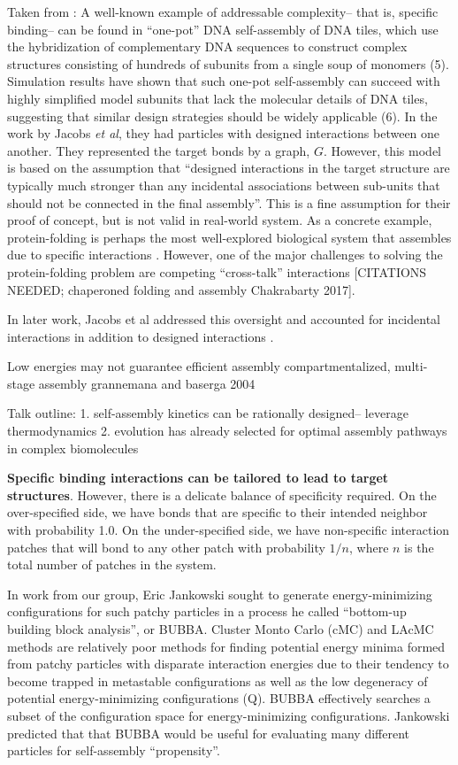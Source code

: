 Taken from \cite{Jacobs_2015_JChemPhys}: 
A well-known example of addressable complexity-- that is, specific binding-- can be found in ``one-pot'' DNA self-assembly of DNA tiles, which use the hybridization of complementary DNA sequences to construct complex structures consisting of hundreds of subunits from a single soup of monomers \cite{Ke_2012_Science} (5).
Simulation results have shown that such one-pot self-assembly can succeed with highly simplified model subunits that lack the molecular details of DNA tiles, suggesting that similar design strategies should be widely applicable \cite{Reinhardt_2014_PRL} (6).
In the work by Jacobs \textit{et al}, they had particles with designed interactions between one another.
They represented the target bonds by a graph, $G$.
However, this model is based on the assumption that ``designed interactions in the target structure are typically much stronger than any incidental associations between sub-units that should not be connected in the final assembly''.
This is a fine assumption for their proof of concept, but is not valid in real-world system.
As a concrete example, protein-folding is perhaps the most well-explored biological system that assembles due to specific interactions \cite{Dill_1993_CurrOpinStructBiol}.
However, one of the major challenges to solving the protein-folding problem are competing ``cross-talk'' interactions [CITATIONS NEEDED; chaperoned folding and assembly Chakrabarty 2017].

In later work, Jacobs et al addressed this oversight and accounted for incidental interactions in addition to designed interactions \cite{Jacobs_2015_PNAS}.


Low energies may not guarantee efficient assembly
compartmentalized, multi-stage assembly
grannemana and baserga 2004

Talk outline:
1. self-assembly kinetics can be rationally designed-- leverage thermodynamics
2. evolution has already selected for optimal assembly pathways in complex biomolecules


\textbf{Specific binding interactions can be tailored to lead to target structures}.
However, there is a delicate balance of specificity required.
On the over-specified side, we have bonds that are specific to their intended neighbor with probability 1.0.
On the under-specified side, we have non-specific interaction patches that will bond to any other patch with probability $1/n$, where $n$ is the total number of patches in the system.

In work from our group, Eric Jankowski sought to generate energy-minimizing configurations for such patchy particles \cite{Jankowski_2009_JChemPhys} in a process he called ``bottom-up building block analysis'', or BUBBA.
Cluster Monto Carlo (cMC) and LAcMC methods are relatively poor methods for finding potential energy minima formed from patchy particles with disparate interaction energies due to their tendency to become trapped in metastable configurations as well as the low degeneracy of potential energy-minimizing configurations (Q).
BUBBA effectively searches a subset of the configuration space for energy-minimizing configurations.
Jankowski predicted that that BUBBA would be useful for evaluating many different particles for self-assembly ``propensity''.

